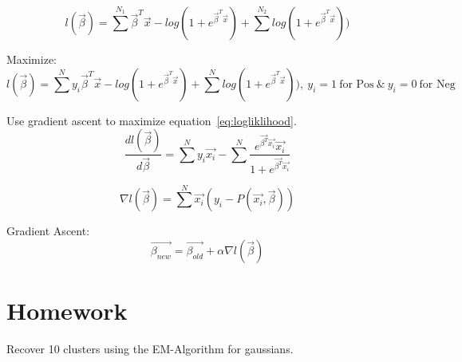 \documentclass[letter, 9pt]{article}
\begin{document}
\begin{equation}
l(\vec{\beta}) = \sum^{N_1}\vec{\beta}^T\vec{x} - log(1 + e^{\vec{\beta}^T\vec{x}}) + \sum^{N_2}log(1 + e^{\vec{\beta}^T\vec{x}}))
\end{equation}

Maximize:
\begin{equation}
\label{eq:logliklihood}
l(\vec{\beta}) = \sum^{N}y_i\vec{\beta}^T\vec{x} - log(1 + e^{\vec{\beta}^T\vec{x}}) + \sum^{N}log(1 + e^{\vec{\beta}^T\vec{x}})),~y_i = 1~\text{for Pos}~ \&~y_i = 0 ~\text{for Neg}
\end{equation}

Use gradient ascent to maximize equation~\ref{eq:logliklihood}.
\begin{equation}
\frac{d l(\vec{\beta})}{d \vec{\beta}} = \sum^N y_i \vec{x_i} - \sum^N \frac{e^{\vec{\beta^T}\vec{x_i}} \vec{x_i}}{1 + e^{\vec{\beta^T}\vec{x_i}}}
\end{equation}

\begin{equation}
\nabla{l(\vec{\beta})} = \sum^N \vec{x_i}(y_i - P(\vec{x_i}, \vec{\beta}))
\end{equation}

Gradient Ascent:
\begin{equation}
\vec{\beta_{new}} = \vec{\beta_{old}} + \alpha \nabla{l(\vec{\beta})}
\end{equation}
\section{Homework}
Recover 10 clusters using the EM-Algorithm for gaussians.
\end{document}
